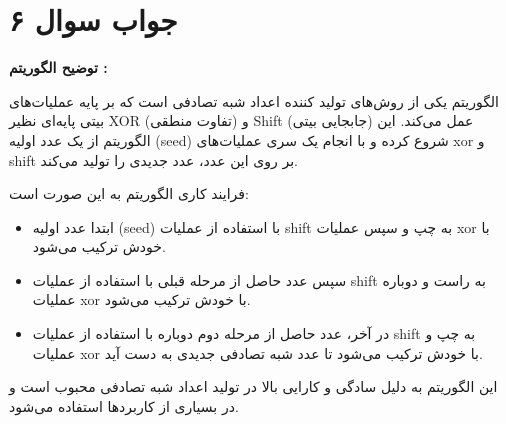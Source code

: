 \section*{جواب سوال ۶}

\textbf{توضیح الگوریتم  :}

الگوریتم  یکی از روش‌های تولید کننده اعداد شبه تصادفی است که بر پایه عملیات‌های بیتی پایه‌ای نظیر XOR (تفاوت منطقی) و Shift (جابجایی بیتی) عمل می‌کند. این الگوریتم از یک عدد اولیه (seed) شروع کرده و با انجام یک سری عملیات‌های xor و shift بر روی این عدد، عدد جدیدی را تولید می‌کند. 

فرایند کاری الگوریتم به این صورت است:
\begin{itemize}
	\item ابتدا عدد اولیه (seed) با استفاده از عملیات shift به چپ و سپس عملیات xor با خودش ترکیب می‌شود.
	\item سپس عدد حاصل از مرحله قبلی با استفاده از عملیات shift به راست و دوباره عملیات xor با خودش ترکیب می‌شود.
	\item در آخر، عدد حاصل از مرحله دوم دوباره با استفاده از عملیات shift به چپ و عملیات xor با خودش ترکیب می‌شود تا عدد شبه تصادفی جدیدی به دست آید.
\end{itemize}

این الگوریتم به دلیل سادگی و کارایی بالا در تولید اعداد شبه تصادفی محبوب است و در بسیاری از کاربردها استفاده می‌شود.

